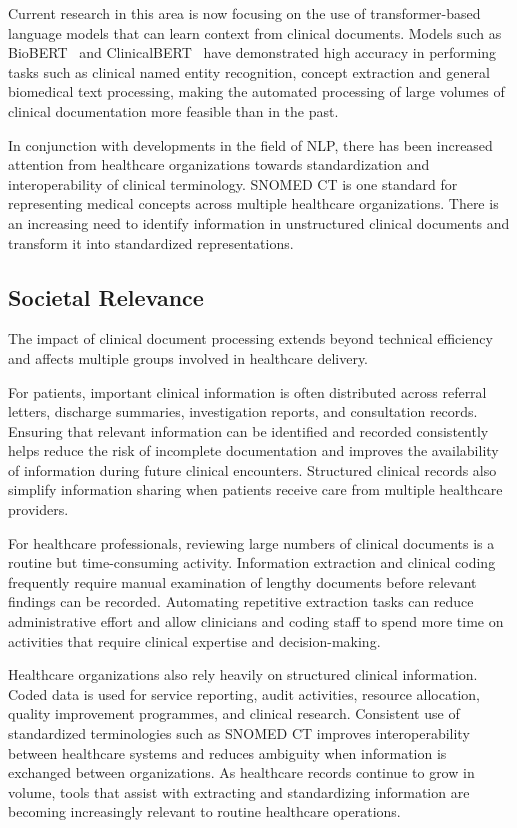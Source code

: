 Current research in this area is now focusing on the use of transformer-based language models that can learn context from clinical documents. Models such as BioBERT~\cite{ref1} and ClinicalBERT~\cite{ref2} have demonstrated high accuracy in performing tasks such as clinical named entity recognition, concept extraction and general biomedical text processing, making the automated processing of large volumes of clinical documentation more feasible than in the past.

In conjunction with developments in the field of NLP, there has been increased attention from healthcare organizations towards standardization and interoperability of clinical terminology. SNOMED CT is one standard for representing medical concepts across multiple healthcare organizations. There is an increasing need to identify information in unstructured clinical documents and transform it into standardized representations.

\subsection{Societal Relevance}

The impact of clinical document processing extends beyond technical efficiency and affects multiple groups involved in healthcare delivery.

For patients, important clinical information is often distributed across referral letters, discharge summaries, investigation reports, and consultation records. Ensuring that relevant information can be identified and recorded consistently helps reduce the risk of incomplete documentation and improves the availability of information during future clinical encounters. Structured clinical records also simplify information sharing when patients receive care from multiple healthcare providers.

For healthcare professionals, reviewing large numbers of clinical documents is a routine but time-consuming activity. Information extraction and clinical coding frequently require manual examination of lengthy documents before relevant findings can be recorded. Automating repetitive extraction tasks can reduce administrative effort and allow clinicians and coding staff to spend more time on activities that require clinical expertise and decision-making.

Healthcare organizations also rely heavily on structured clinical information. Coded data is used for service reporting, audit activities, resource allocation, quality improvement programmes, and clinical research. Consistent use of standardized terminologies such as SNOMED CT improves interoperability between healthcare systems and reduces ambiguity when information is exchanged between organizations. As healthcare records continue to grow in volume, tools that assist with extracting and standardizing information are becoming increasingly relevant to routine healthcare operations.

